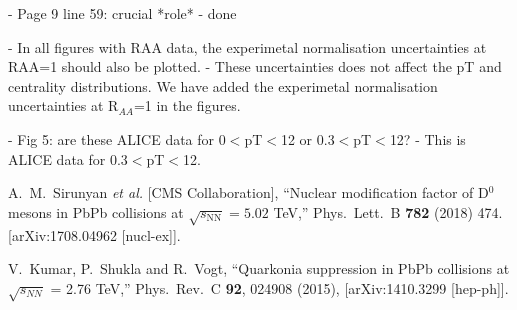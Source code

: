 \documentclass[a4paper,11pt]{article}
\begin{document}
- Page 9 line 59: crucial *role* \newline
- {\color{blue} done}\newline

- In all figures with RAA data, the experimetal normalisation uncertainties at RAA=1 should also be plotted.\newline 
- {\color{blue} These uncertainties does not affect the pT and centrality distributions. We have added the
  experimetal normalisation uncertainties at R$_{AA}$=1 in the figures.}\newline

- Fig 5: are these ALICE data for 0$<$pT$<$12 or 0.3$<$pT$<$12?\newline
- {\color{blue}This is ALICE data for 0.3$<$pT$<$12.}\newline










\noindent
\begin{thebibliography}{100}
\medskip




  A.~M.~Sirunyan {\it et al.} [CMS Collaboration],
  ``Nuclear modification factor of D$^0$ mesons in PbPb collisions at  $\sqrt{s_\mathrm{NN}} = 5.02$ TeV,''
  Phys.\ Lett.\ B {\bf 782} (2018) 474.  [arXiv:1708.04962 [nucl-ex]].

  V.~Kumar, P.~Shukla and R.~Vogt,
  ``Quarkonia suppression in PbPb collisions at $\sqrt{s_{NN}}$ = 2.76 TeV,''
  Phys.\ Rev.\ C {\bf 92}, 024908 (2015),
  [arXiv:1410.3299 [hep-ph]].


  
\end{thebibliography}
\end{document}
